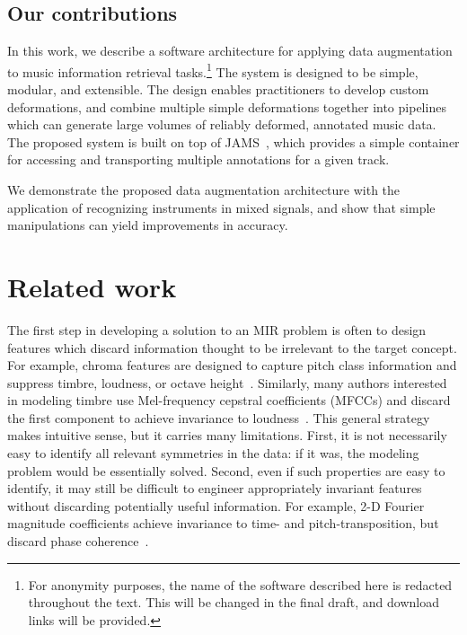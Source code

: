\documentclass{article}
\begin{document}
\subsection{Our contributions}
In this work, we describe a software architecture for applying data augmentation to music
information retrieval tasks.\footnote{For anonymity purposes, the name of the software 
    described here is redacted throughout the text.  This will be changed in the final
draft, and download links will be provided.}
The system is designed to be simple, modular, and
extensible. The design enables practitioners to develop custom deformations, and combine
multiple simple deformations together into pipelines which can generate large volumes of
reliably deformed, annotated music data.  The proposed system is built on top of
JAMS~\cite{humphreyjams}, which provides a simple container for accessing and
transporting multiple annotations for a given track.

We demonstrate the proposed data augmentation architecture with the application
of recognizing instruments in mixed signals, and show that simple
manipulations can yield improvements in accuracy.

\section{Related work}

The first step in developing a solution to an MIR problem is often to
design features which discard information thought to be irrelevant to the target
concept.  For example, chroma features are designed to capture pitch class information
and suppress timbre, loudness, or octave height~\cite{muller2011chroma}.
Similarly, many authors interested in modeling timbre
use Mel-frequency cepstral coefficients (MFCCs) and discard the first component to
achieve invariance to loudness~\cite{pampalk2004matlab}.
This general strategy makes intuitive sense, but it carries many limitations.
First, it is not necessarily easy to identify all relevant symmetries in the
data: if it was, the modeling problem would be essentially solved.
Second, even if such properties are easy to identify, it may still be difficult to
engineer appropriately invariant features without discarding potentially useful
information.  For example, 2-D Fourier magnitude coefficients achieve invariance to
time- and pitch-transposition, but discard phase coherence~\cite{ellis2012large}.
\end{document}
